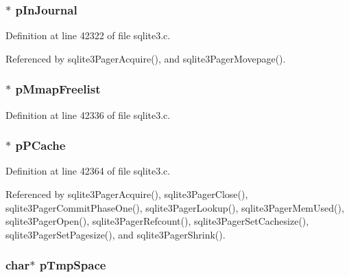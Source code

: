 \hypertarget{struct_pager_aa96b10cfc9fc60aa0c349bcaabb9b4bb}{}
\subsubsection[{p\+In\+Journal}]{$\ast$ p\+In\+Journal}\label{struct_pager_aa96b10cfc9fc60aa0c349bcaabb9b4bb}


Definition at line 42322 of file sqlite3.\+c.



Referenced by sqlite3\+Pager\+Acquire(), and sqlite3\+Pager\+Movepage().

\hypertarget{struct_pager_ae13253447db00c0cb1613cf60f77afc3}{}
\subsubsection[{p\+Mmap\+Freelist}]{$\ast$ p\+Mmap\+Freelist}\label{struct_pager_ae13253447db00c0cb1613cf60f77afc3}


Definition at line 42336 of file sqlite3.\+c.

\hypertarget{struct_pager_af7a3a5c5ac8350d706a68a66e5675f2d}{}
\subsubsection[{p\+P\+Cache}]{$\ast$ p\+P\+Cache}\label{struct_pager_af7a3a5c5ac8350d706a68a66e5675f2d}


Definition at line 42364 of file sqlite3.\+c.



Referenced by sqlite3\+Pager\+Acquire(), sqlite3\+Pager\+Close(), sqlite3\+Pager\+Commit\+Phase\+One(), sqlite3\+Pager\+Lookup(), sqlite3\+Pager\+Mem\+Used(), sqlite3\+Pager\+Open(), sqlite3\+Pager\+Refcount(), sqlite3\+Pager\+Set\+Cachesize(), sqlite3\+Pager\+Set\+Pagesize(), and sqlite3\+Pager\+Shrink().

\hypertarget{struct_pager_a440071186989fd8259c13a1f1439df19}{}
\subsubsection[{p\+Tmp\+Space}]{\setlength{\rightskip}{0pt plus 5cm}char$\ast$ p\+Tmp\+Space}\label{struct_pager_a440071186989fd8259c13a1f1439df19}


